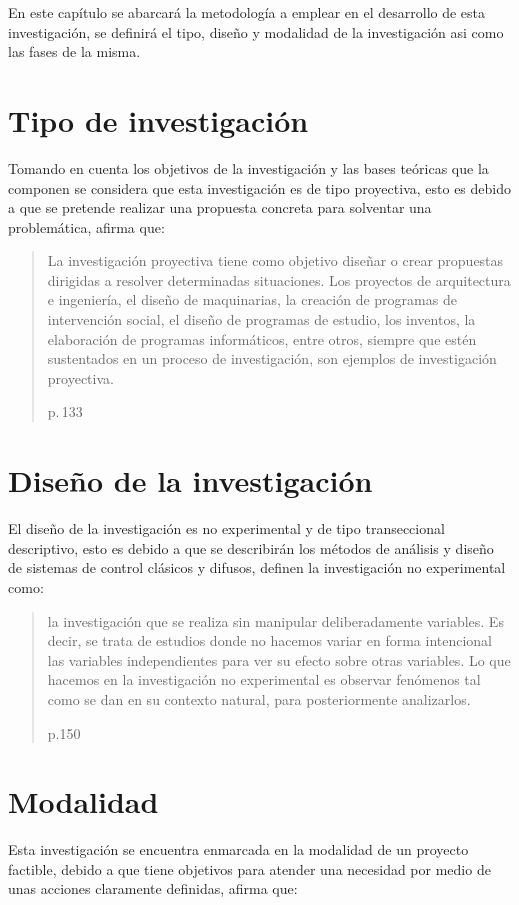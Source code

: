 En este capítulo se abarcará la metodología a emplear en el desarrollo de esta investigación, se definirá el tipo, diseño y modalidad de la investigación asi como las fases de la misma.

\section{Tipo de investigación}
	
	Tomando en cuenta los objetivos de la investigación y las bases teóricas que la componen se considera que esta investigación es de tipo proyectiva, esto es debido a que se pretende realizar una propuesta concreta para solventar una problemática, \textcite{jacquelin2010guia} afirma que:	
	
	\blockquote[p.$\,$133]{La investigación proyectiva tiene como objetivo diseñar o crear propuestas dirigidas a resolver determinadas situaciones. Los proyectos de arquitectura e ingeniería, el diseño de maquinarias, la creación de programas de intervención social, el diseño de programas de estudio, los inventos, la elaboración de programas informáticos, entre otros, siempre que estén sustentados en un proceso de investigación, son ejemplos de investigación proyectiva.}

\section{Diseño de la investigación}

	El diseño de la investigación es no experimental y de tipo transeccional descriptivo, esto es debido a que se describirán los métodos de análisis y diseño de sistemas de control clásicos y difusos, \textcite{sampieri1998metodologia} definen  la investigación no experimental como: \blockquote[p.150]{la investigación que se realiza sin manipular deliberadamente variables. Es decir,
	se trata de estudios donde no hacemos variar en forma intencional las variables independientes para
	ver su efecto sobre otras variables. Lo que hacemos en la investigación no experimental
	es observar fenómenos tal como se dan en su contexto natural, para posteriormente
	analizarlos.}

\section{Modalidad}

	Esta investigación se encuentra enmarcada en la modalidad de un proyecto factible, debido a que tiene objetivos para atender una necesidad por medio de unas acciones claramente definidas, \textcite{renie2002factible} afirma que:
	
